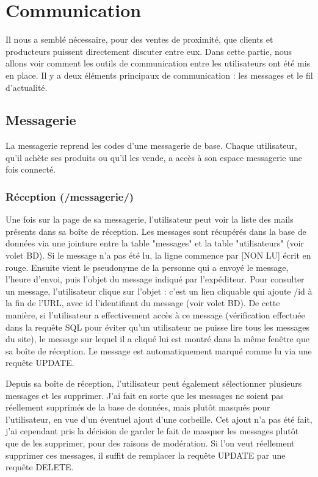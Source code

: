 \documentclass{article}
\begin{document}
\section{Communication}

Il nous a semblé nécessaire, pour des ventes de proximité, que clients et producteurs puissent directement discuter entre eux. Dans cette partie, nous allons voir comment les outils de communication entre les utilisateurs ont été mis en place. Il y a deux éléments principaux de communication : les messages et le fil d'actualité.

\subsection{Messagerie}

La messagerie reprend les codes d'une messagerie de base. Chaque utilisateur, qu'il achète ses produits ou qu'il les vende, a accès à son espace messagerie une fois connecté.

\subsubsection{Réception (/messagerie/)}

Une fois sur la page de sa messagerie, l'utilisateur peut voir la liste des mails présents dans sa boîte de réception. Les messages sont récupérés dans la base de données via une jointure entre la table "messages" et la table "utilisateurs" (voir volet BD). Si le message n'a pas été lu, la ligne commence par [NON LU] écrit en rouge. Ensuite vient le pseudonyme de la personne qui a envoyé le message, l'heure d'envoi, puis l'objet du message indiqué par l'expéditeur. Pour consulter un message, l'utilisateur clique sur l'objet : c'est un lien cliquable qui ajoute /id à la fin de l'URL, avec id l'identifiant du message (voir volet BD). De cette manière, si l'utilisateur a effectivement accès à ce message (vérification effectuée dans la requête SQL pour éviter qu'un utilisateur ne puisse lire tous les messages du site), le message sur lequel il a cliqué lui est montré dans la même fenêtre que sa boîte de réception. Le message est automatiquement marqué comme lu via une requête UPDATE.

Depuis sa boîte de réception, l'utilisateur peut également sélectionner plusieurs messages et les supprimer. J'ai fait en sorte que les messages ne soient pas réellement supprimés de la base de données, mais plutôt masqués pour l'utilisateur, en vue d'un éventuel ajout d'une corbeille. Cet ajout n'a pas été fait, j'ai cependant pris la décision de garder le fait de masquer les messages plutôt que de les supprimer, pour des raisons de modération. Si l'on veut réellement supprimer ces messages, il suffit de remplacer la requête UPDATE par une requête DELETE.
\end{document}
